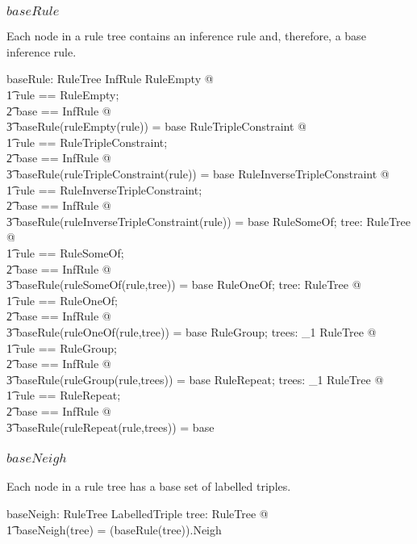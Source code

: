 \documentclass{article}
\begin{document}
\subsubsection{$baseRule$}
Each node in a rule tree contains an inference rule and, therefore, a base inference rule.
\begin{axdef}
	baseRule: RuleTree \fun InfRule
\where
	\forall RuleEmpty @ \\
\t1		\LET rule == \theta RuleEmpty; \\
\t2			base == \theta InfRule @ \\
\t3				baseRule(ruleEmpty(rule)) = base
\also
	\forall RuleTripleConstraint @ \\
\t1		\LET rule == \theta RuleTripleConstraint; \\
\t2			base == \theta InfRule @ \\
\t3			baseRule(ruleTripleConstraint(rule)) = base
\also
	\forall RuleInverseTripleConstraint @ \\
\t1		\LET rule == \theta RuleInverseTripleConstraint; \\
\t2			base == \theta InfRule @ \\
\t3				baseRule(ruleInverseTripleConstraint(rule)) = base
\also
	\forall RuleSomeOf; tree: RuleTree @ \\
\t1		\LET rule == \theta RuleSomeOf; \\
\t2			base == \theta InfRule @ \\
\t3				baseRule(ruleSomeOf(rule,tree)) = base
\also
	\forall RuleOneOf; tree: RuleTree @ \\
\t1		\LET rule == \theta RuleOneOf; \\
\t2			base == \theta InfRule @ \\
\t3				baseRule(ruleOneOf(rule,tree)) = base
\also
	\forall RuleGroup; trees: \seq_1 RuleTree @ \\
\t1		\LET rule == \theta RuleGroup; \\
\t2			base == \theta InfRule @ \\
\t3				baseRule(ruleGroup(rule,trees)) = base
\also
	\forall RuleRepeat; trees: \seq_1 RuleTree @ \\
\t1		\LET rule == \theta RuleRepeat; \\
\t2			base == \theta InfRule @ \\
\t3				baseRule(ruleRepeat(rule,trees)) = base
\end{axdef}

\subsubsection{$baseNeigh$}
Each node in a rule tree has a base set of labelled triples.
\begin{axdef}
	baseNeigh: RuleTree \fun \finset LabelledTriple
\where
	\forall tree: RuleTree @ \\
\t1		baseNeigh(tree) = (baseRule(tree)).Neigh
\end{axdef}
\end{document}
